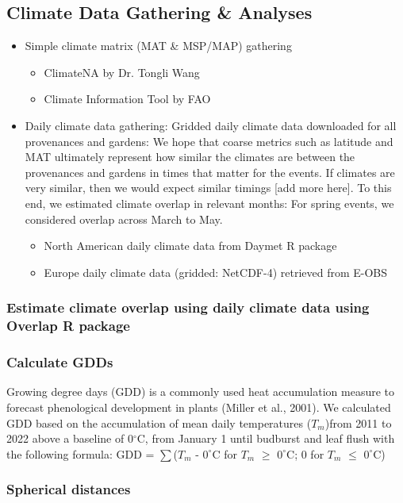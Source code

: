 \documentclass{article}
\begin{document}
\subsection{Climate Data Gathering \& Analyses}
  \begin{itemize}
  \item Simple climate matrix (MAT \& MSP/MAP) gathering
  \begin{itemize}
  \item ClimateNA by Dr. Tongli Wang
  \item Climate Information Tool by FAO
  \end{itemize}
  \item Daily climate data gathering: Gridded daily climate data downloaded for all provenances and gardens: We hope that coarse metrics such as latitude and MAT ultimately represent how similar the climates are between the provenances and gardens in times that matter for the events. If climates are very similar, then we would expect similar timings [add more here].
To this end, we estimated climate overlap in relevant months: For spring events, we considered overlap across March to May.
  \begin{itemize}
  \item North American daily climate data from Daymet R package
  \item Europe daily climate data (gridded: NetCDF-4) retrieved from E-OBS 
  \end{itemize}
  \end{itemize}

\subsubsection{Estimate climate overlap using daily climate data using Overlap R package}
\subsubsection{Calculate GDDs}


Growing degree days (GDD) is a commonly used heat accumulation measure to forecast phenological development in plants (Miller et al., 2001). We calculated GDD based on the accumulation of mean daily temperatures ($T_{m}$)from 2011 to 2022 above a baseline of 0$^{\circ}$C, from January 1 until budburst and leaf flush with the following formula: GDD = $\sum$($T_{m}$ - $0^{\circ}$C for $T_{m}$ $\ge$ $0^{\circ}$C; 0 for $T_{m}$ $\le$ $0^{\circ}$C) 


\subsubsection{Spherical distances}
\end{document}
